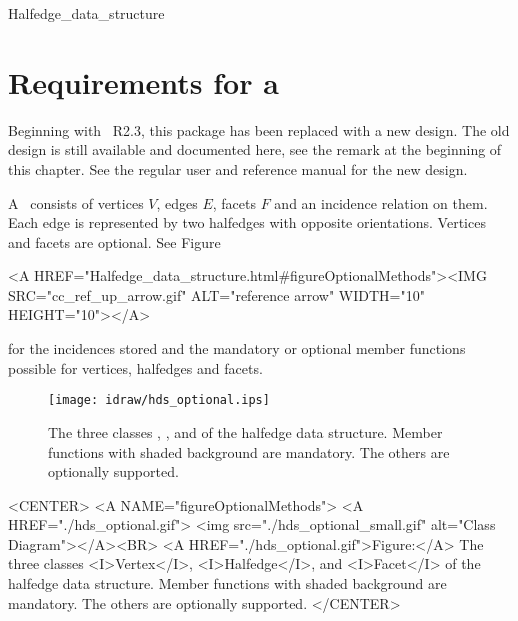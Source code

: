 \ccHtmlNoClassToc
\begin{ccClass}{Halfedge_data_structure}
\section{Requirements for a \protect{}}
\label{sectionHds}
\def\ccTagRmTrailingConst{\ccFalse}


Beginning with \cgal\ R2.3, this package has been replaced with a new
design. The old design is still available and documented here, see the
remark at the beginning of this chapter. See the regular user and
reference manual for the new design.

\ccDefinition  

A \ccClassTemplateName\ consists of vertices $V$, edges $E$, facets
$F$ and an incidence relation on them.  Each edge is represented by
two halfedges with opposite orientations. Vertices and facets are
optional. See 
Figure~\ccTexHtml{\ref{figureOptionalMethods}}{}\begin{ccHtmlOnly}
  <A HREF="Halfedge_data_structure.html#figureOptionalMethods"><IMG 
  SRC="cc_ref_up_arrow.gif" ALT="reference arrow" WIDTH="10" HEIGHT="10"></A>
\end{ccHtmlOnly}
 for the incidences
stored and the mandatory or optional member functions possible for
vertices, halfedges and facets.

\begin{ccTexOnly}
    \begin{figure}
        \begin{center}
          \parbox{\textwidth}{%
              \texttt{[image: idraw/hds\_optional.ips]}%
          }
        \end{center}
        \caption{The three classes \protect{}, 
          \protect{}, and 
          \protect{} of the halfedge data structure. Member
          functions with shaded background are mandatory. The others
          are optionally supported.}
        \label{figureOptionalMethods}
    \end{figure}
\end{ccTexOnly}

\begin{ccHtmlOnly}
    <CENTER>
    <A NAME="figureOptionalMethods">
    <A HREF="./hds_optional.gif">
        <img src="./hds_optional_small.gif" 
             alt="Class Diagram"></A><BR>
    <A HREF="./hds_optional.gif">Figure:</A>
    The three classes <I>Vertex</I>, <I>Halfedge</I>, and 
          <I>Facet</I> of the halfedge data structure. Member
          functions with shaded background are mandatory. The others
          are optionally supported.
    </CENTER>
\end{ccHtmlOnly}


\end{ccClass}
